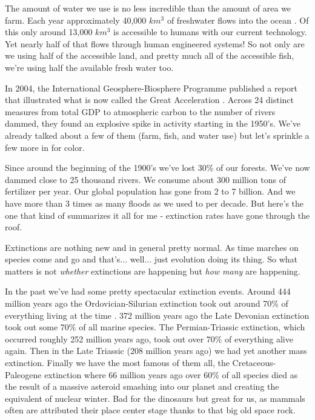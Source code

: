 \documentclass[11pt,a5paper]{book}
\begin{document}
The amount of water we use is no less incredible than the amount of area we farm. Each year approximately 40,000 $km^3$ of freshwater flows into the ocean \cite{eellis}. Of this only around 13,000 $km^3$ is accessible to humans with our current technology. Yet nearly half of that flows through human engineered systems! So not only are we using half of the accessible land, and pretty much all of the accessible fish, we're using half the available fresh water too. 

In 2004, the International Geosphere-Biosphere Programme published a report that illustrated what is now called the Great Acceleration \cite{wsteffen}. Across 24 distinct measures from total GDP to atmospheric carbon to the number of rivers dammed, they found an explosive spike in activity starting in the 1950's. We've already talked about a few of them (farm, fish, and water use) but let's sprinkle a few more in for color. 

Since around the beginning of the 1900's we've lost 30\% of our forests. We've now dammed close to 25 thousand rivers. We consume about 300 million tons of fertilizer per year. Our global population has gone from 2 to 7 billion. And we have more than 3 times as many floods as we used to per decade. But here's the one that kind of summarizes it all for me - extinction rates have gone through the roof.  
\newline

Extinctions are nothing new and in general pretty normal. As time marches on species come and go and that's... well... just evolution doing its thing. So what matters is not \textit{whether} extinctions are happening but \textit{how many} are happening. 

In the past we've had some pretty spectacular extinction events. Around 444 million years ago the Ordovician-Silurian extinction took out around 70\% of everything living at the time \cite{adubey}. 372 million years ago the Late Devonian extinction took out some 70\% of all marine species. The Permian-Triassic extinction, which occurred roughly 252 million years ago, took out over 70\% of everything alive again. Then in the Late Triassic (208 million years ago) we had yet another mass extinction. Finally we have the most famous of them all, the Cretaceous-Paleogene extinction where 66 million years ago over 60\% of all species died as the result of a massive asteroid smashing into our planet and creating the equivalent of nuclear winter. Bad for the dinosaurs but great for us, as mammals often are attributed their place center stage thanks to that big old space rock. 
\end{document}
